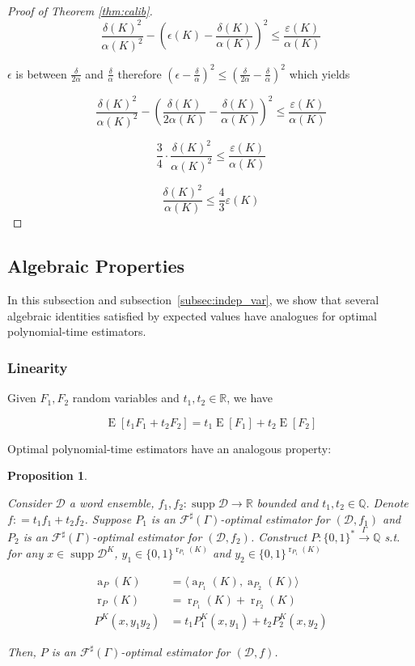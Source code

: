 \documentclass{article}
\numberwithin{equation}{section}
\theoremstyle{definition}
\theoremstyle{plain}
\newtheorem{proposition}{Proposition}[section]
\newcommand{\Bool}{\{0,1\}}
\newcommand{\Words}{{\Bool^*}}
\newcommand{\WordsLen}[1]{{\Bool^{#1}}}
\DeclareMathOperator{\Supp}{supp}
\DeclareMathOperator{\E}{E}
\DeclareMathOperator{\R}{r}
\DeclareMathOperator{\A}{a}
\newcommand{\Rats}{\mathbb{Q}}
\newcommand{\Reals}{\mathbb{R}}
\newcommand{\Chev}[1]{\langle #1 \rangle}
\newcommand{\Dist}{\mathcal{D}}
\newcommand{\Fall}{\mathcal{F}}
\newcommand{\ESG}{\Fall^\sharp(\Gamma)}
\newcommand{\Scheme}{\xrightarrow{\Gamma}}
\begin{document}
\begin{proof}[Proof of Theorem \ref{thm:calib}]
$$\frac{\delta(K)^2}{\alpha(K)^2}-(\epsilon(K) - \frac{\delta(K)}{\alpha(K)})^2 \leq \frac{\varepsilon(K)}{\alpha(K)}$$

$\epsilon$ is between $\frac{\delta}{2\alpha}$ and $\frac{\delta}{\alpha}$ therefore $(\epsilon-\frac{\delta}{\alpha})^2 \leq (\frac{\delta}{2\alpha} - \frac{\delta}{\alpha})^2$  which yields

$$\frac{\delta(K)^2}{\alpha(K)^2}-(\frac{\delta(K)}{2\alpha(K)} - \frac{\delta(K)}{\alpha(K)})^2 \leq \frac{\varepsilon(K)}{\alpha(K)}$$

$$\frac{3}{4} \cdot \frac{\delta(K)^2}{\alpha(K)^2} \leq \frac{\varepsilon(K)}{\alpha(K)}$$

$$\frac{\delta(K)^2}{\alpha(K)} \leq \frac{4}{3}\varepsilon(K)$$
\end{proof}

\subsection{Algebraic Properties}
\label{subsec:alg}

In this subsection and subsection~\ref{subsec:indep_var}, we show that several algebraic identities satisfied by expected values have analogues for optimal polynomial-time estimators.

\subsubsection{Linearity}

Given $F_1,F_2$ random variables and $t_1,t_2 \in \Reals$, we have 

\begin{equation}
\E[t_1 F_1 + t_2 F_2] = t_1 \E[F_1] + t_2 \E[F_2]
\end{equation}

Optimal polynomial-time estimators have an analogous property:

\begin{proposition}
\label{prp:linearity}

Consider $\Dist$ a word ensemble, $f_1,f_2: \Supp \Dist \rightarrow \Reals$ bounded and $t_1,t_2 \in \Rats$. Denote $f: = t_1 f_1 + t_2 f_2$. Suppose $P_1$ is an $\ESG$-optimal estimator for $(\Dist,f_1)$ and $P_2$ is an $\ESG$-optimal estimator for $(\Dist,f_2)$. Construct $P: \Words \Scheme \Rats$ s.t. for any ${x \in \Supp \Dist^{K}}$, ${y_1 \in \WordsLen{\R_{P_1}(K)}}$ and $y_2 \in \WordsLen{\R_{P_1}(K)}$

\begin{align}
\A_P(K) &= \Chev{\A_{P_1}(K),\A_{P_2}(K)} \\
\R_P(K) &= \R_{P_1}(K) + \R_{P_2}(K) \\
P^{K}(x,y_1 y_2) &= t_1 P_1^{K}(x,y_1) + t_2 P_2^{K}(x, y_2)
\end{align}

Then, $P$ is an $\ESG$-optimal estimator for $(\Dist, f)$.

\end{proposition}
\end{document}
